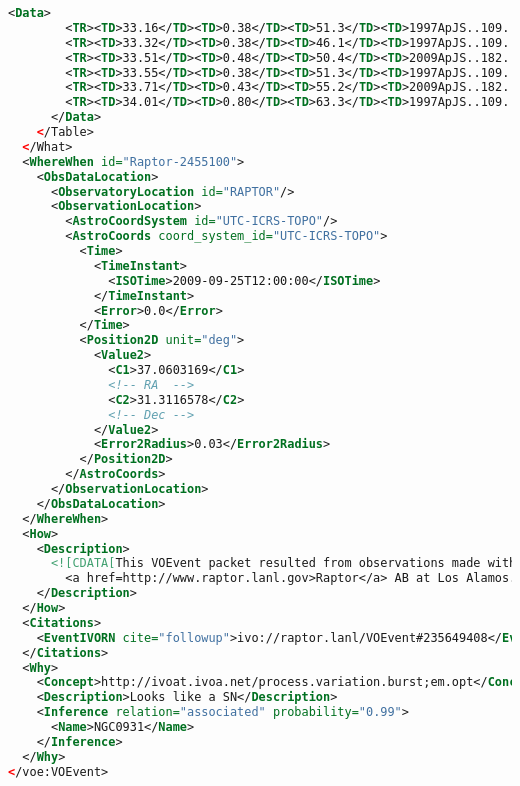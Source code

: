 \documentclass[11pt,a4paper]{ivoa}
\begin{document}
\begin{lstlisting}[language=XML]
      <Data>
        <TR><TD>33.16</TD><TD>0.38</TD><TD>51.3</TD><TD>1997ApJS..109..333W</TD></TR>
        <TR><TD>33.32</TD><TD>0.38</TD><TD>46.1</TD><TD>1997ApJS..109..333W</TD></TR>
        <TR><TD>33.51</TD><TD>0.48</TD><TD>50.4</TD><TD>2009ApJS..182..474S</TD></TR>
        <TR><TD>33.55</TD><TD>0.38</TD><TD>51.3</TD><TD>1997ApJS..109..333W</TD></TR>
        <TR><TD>33.71</TD><TD>0.43</TD><TD>55.2</TD><TD>2009ApJS..182..474S</TD></TR>
        <TR><TD>34.01</TD><TD>0.80</TD><TD>63.3</TD><TD>1997ApJS..109..333W</TD></TR>
      </Data>
    </Table>
  </What>
  <WhereWhen id="Raptor-2455100">
    <ObsDataLocation>
      <ObservatoryLocation id="RAPTOR"/>
      <ObservationLocation>
        <AstroCoordSystem id="UTC-ICRS-TOPO"/>
        <AstroCoords coord_system_id="UTC-ICRS-TOPO">
          <Time>
            <TimeInstant>
              <ISOTime>2009-09-25T12:00:00</ISOTime>
            </TimeInstant>
            <Error>0.0</Error>
          </Time>
          <Position2D unit="deg">
            <Value2>
              <C1>37.0603169</C1>
              <!-- RA  -->
              <C2>31.3116578</C2>
              <!-- Dec -->
            </Value2>
            <Error2Radius>0.03</Error2Radius>
          </Position2D>
        </AstroCoords>
      </ObservationLocation>
    </ObsDataLocation>
  </WhereWhen>
  <How>
    <Description>
      <![CDATA[This VOEvent packet resulted from observations made with
        <a href=http://www.raptor.lanl.gov>Raptor</a> AB at Los Alamos. ]]>
    </Description>
  </How>
  <Citations>
    <EventIVORN cite="followup">ivo://raptor.lanl/VOEvent#235649408</EventIVORN>
  </Citations>
  <Why>
    <Concept>http://ivoat.ivoa.net/process.variation.burst;em.opt</Concept>
    <Description>Looks like a SN</Description>
    <Inference relation="associated" probability="0.99">
      <Name>NGC0931</Name>
    </Inference>
  </Why>
</voe:VOEvent>
\end{lstlisting}
\end{document}
